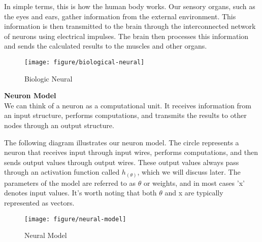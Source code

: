 \documentclass{article}
\begin{document}
    In simple terms, this is how the human body works. Our sensory organs, such as the eyes and ears, gather information from the external environment. This information is then transmitted to the brain through the interconnected network of neurons using electrical impulses. The brain then processes this information and sends the calculated results to the muscles and other organs. \\

    \begin{figure}[htbp]
        \centering
        \texttt{[image: figure/biological-neural]}
        \caption{Biologic Neural}
     \end{figure}


    \noindent
    \textbf{Neuron Model}\\
    We can think of a neuron as a computational unit. It receives information from an input structure, performs computations, and transmits the results to other nodes through an output structure.

    The following diagram illustrates our neuron model. The circle represents a neuron that receives input through input wires, performs computations, and then sends output values through output wires. These output values always pass through an activation function called $h_(\theta)$, which we will discuss later. The parameters of the model are referred to as $\theta$ or weights, and in most cases 'x' denotes input values. It's worth noting that both $\theta$ and x are typically represented as vectors.


    \begin{figure}[htbp]
        \centering
        \texttt{[image: figure/neural-model]}
        \caption{Neural Model}
     \end{figure}
\end{document}
